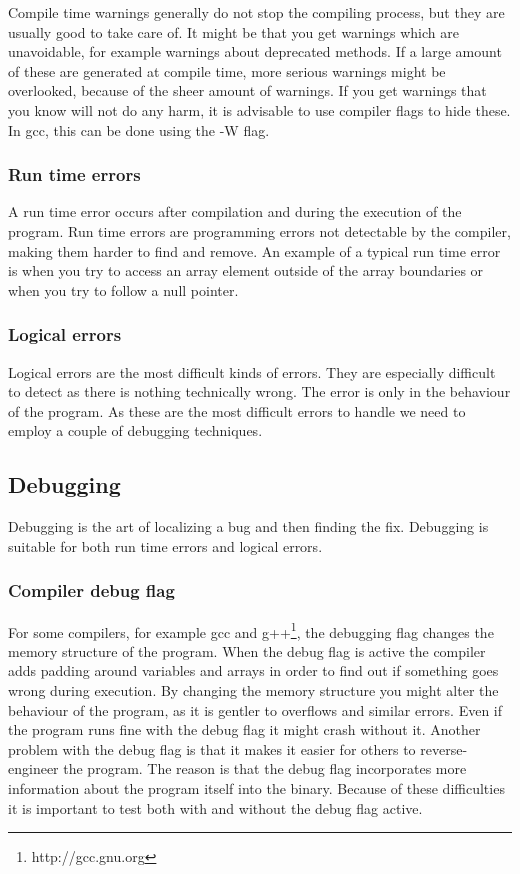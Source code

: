 \documentclass[11pt,a4paper,twoside]{article}
\begin{document}
Compile time warnings generally do not stop the compiling process, but they are
usually good to take care of. It might be that you get warnings which are
unavoidable, for example warnings about deprecated methods. If a large amount
of these are generated at compile time, more serious warnings might be
overlooked, because of the sheer amount of warnings. If you get warnings that
you know will not do any harm, it is advisable to use compiler flags to hide
these. In gcc, this can be done using the -W flag.

\subsubsection{Run time errors}

A run time error occurs after compilation and during the execution of the
program. Run time errors are programming errors not detectable by the compiler,
making them harder to find and remove. An example of a typical run time error
is when you try to access an array element outside of the array boundaries or
when you try to follow a null pointer.

\subsubsection{Logical errors}

Logical errors are the most difficult kinds of errors. They are especially
difficult to detect as there is nothing technically wrong. The error is only in
the behaviour of the program. As these are the most difficult errors to handle
we need to employ a couple of debugging techniques.

\subsection{Debugging}

Debugging is the art of localizing a bug and then finding the fix. Debugging is
suitable for both run time errors and logical errors. 

\subsubsection{Compiler debug flag}

For some compilers, for example gcc and g++\footnote{http://gcc.gnu.org}, the
debugging flag changes the memory structure of the program. When the debug flag
is active the compiler adds padding around variables and arrays in order to
find out if something goes wrong during execution. By changing the memory
structure you might alter the behaviour of the program, as it is gentler to
overflows and similar errors.  Even if the program runs fine with the debug
flag it might crash without it.  Another problem with the debug flag is that it
makes it easier for others to reverse-engineer the program. The reason is that
the debug flag incorporates more information about the program itself into the
binary. Because of these difficulties it is important to test both with and
without the debug flag active.
\end{document}
